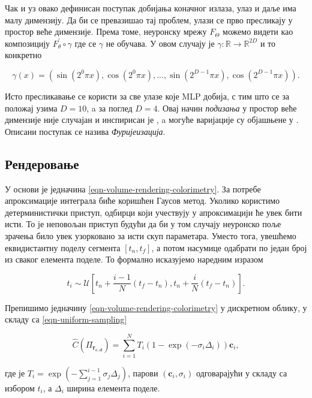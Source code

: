 \documentclass[12pt, a4paper, twoside]{book}
\numberwithin{equation}{chapter}
\numberwithin{theorem}{section}
\numberwithin{definition}{section}
\numberwithin{definitionChapter}{chapter}
\begin{document}
Чак и уз овако дефинисан поступак добијања коначног излаза, улаз и даље има малу димензију. Да би се превазишао
тај проблем, улази се прво пресликају у простор веће димензије. Према томе, неуронску мрежу $F_\Theta$ можемо
видети као композицију $F_\theta^\prime \circ \gamma$ где се $\gamma$ не обучава. У овом случају је
$\gamma : \mathbb{R} \rightarrow \mathbb{R}^{2D}$ и то конкретно

\begin{equation}
	\gamma(x) = (\sin(2^0\pi x), \cos(2^0 \pi x), ..., \sin(2^{D-1}\pi x), \cos(2^{D-1}\pi x)).
	\label{eqn-fourier-features}
\end{equation}

Исто пресликавање се користи за све улазе које MLP добија, с тим што се за положај узима $D=10$, a за поглед $D=4$.
Овај начин \textit{подизања} у простор веће димензије није случајан и инспирисан је \cite{transformer}, a могуће
варијације су објашњене у \cite{fourier-coefficients}. Описани поступак се назива \textit{Фуријеизација}.

\subsection{Рендеровање}
У основи је једначина \ref{eqn-volume-rendering-colorimetry}. За потребе апроксимације интеграла биће коришћен
Гаусов метод. Уколико користимо детерминистички приступ, одбирци који учествују у апроксимацији ће увек бити исти.
То је неповољан приступ будући да би у том случају неуронско поље зрачења било увек узорковано за исти скуп
параметара. Уместо тога, увешћемо еквидистантну поделу сегмента $\left[t_n, t_f\right]$, а потом насумице
одабрати по један број из сваког елемента поделе. То формално исказујемо наредним изразом

\begin{equation}
	t_i \sim \mathcal{U}\left[t_n + \frac{i - 1}{N}(t_f - t_n), t_n + \frac{i}{N}(t_f -t_n)\right].
	\label{eqn-uniform-sampling}
\end{equation}

Препишимо једначину \ref{eqn-volume-rendering-colorimetry} у дискретном облику, у складу са
\ref{eqn-uniform-sampling}

\begin{equation}
	\hat{C}(\Pi_{\mathbf{r_{c, d}}}) = \sum_{i=1}^{N} T_i (1- \exp(-\sigma_i\Delta_i)) \mathbf{c}_i,
	\label{eqn-discrete-rendering}
\end{equation}

где је $T_i = \exp\left(-\sum_{j=1}^{i-1}\sigma_j\Delta_j\right)$, парови $(\mathbf{c}_i, \sigma_i)$
одговарајући у складу са избором $t_i$, а $\Delta_i$ ширина елемента поделе.
\end{document}
